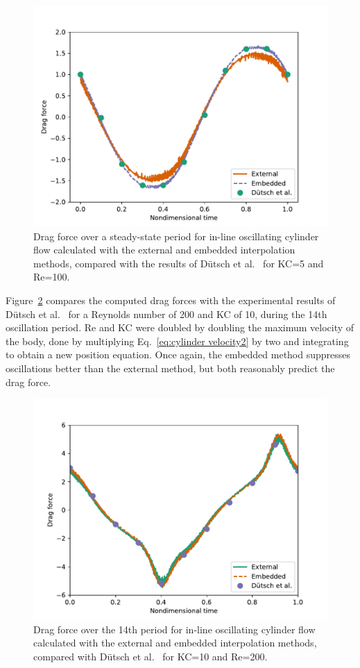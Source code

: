 \documentclass[preprint,12pt]{elsarticle}
\begin{document}
\begin{figure}[htbp]
    \centering
    \includegraphics[width=0.75\linewidth]{static_ss.pdf}
    \caption{Drag force over a steady-state period for in-line oscillating cylinder flow
    calculated with the external and embedded interpolation methods, compared with
    the results of D\"{u}tsch et al.~\cite{dutsch1998low} for KC=5 and Re=100.
    }
    \label{fig:staticSteady}
\end{figure}

Figure~\ref{fig:KC 10} compares the computed drag forces with the experimental results
of D\"{u}tsch et al.~\cite{dutsch1998low} for a Reynolds number of 200 and KC of 10, during the 14th oscillation period.
Re and KC were doubled by doubling the maximum velocity of the body, done
by multiplying Eq.~\eqref{eq:cylinder velocity2} by two and integrating to
obtain a new position equation. Once again, the embedded method suppresses oscillations
better than the external method, but both reasonably predict the drag force.
\begin{figure}[htbp]
    \centering
    \includegraphics[width=0.75\linewidth]{static_kc10.pdf}
    \caption{Drag force over the 14th period for in-line oscillating cylinder flow
    calculated with the external and embedded interpolation methods,
    compared with D\"{u}tsch et al.~\cite{dutsch1998low} for KC=10 and Re=200.}
    \label{fig:KC 10}
\end{figure}
\end{document}
